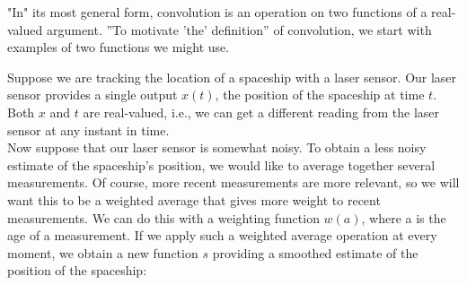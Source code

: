 \documentclass{article}
\begin{document}
"In" its most general form, convolution is an operation on two functions
of a real-valued argument.
''To motivate 'the' definition'' of convolution, we start with examples of
two functions we might use.

Suppose we are tracking the location of a spaceship with a laser sensor.
Our laser sensor provides a single output $x(t)$, the position of the
spaceship at time $t$.
Both $x$ and $t$ are real-valued, i.e., we can get a different reading
from the laser sensor at any instant in time.\\
Now suppose that our laser sensor is somewhat noisy.
To obtain a less noisy estimate of the spaceship’s position,
we would like to average together several measurements.
Of course, more recent measurements are more relevant, so we will
want this to be a weighted average that gives more weight to recent
measurements.
\newpage
We can do this with a weighting function $w(a)$, where a is the age of
a measurement.
If we apply such a weighted average operation at every moment, we obtain
a new function $s$ providing a smoothed estimate of the position
of the spaceship:
\end{document}

